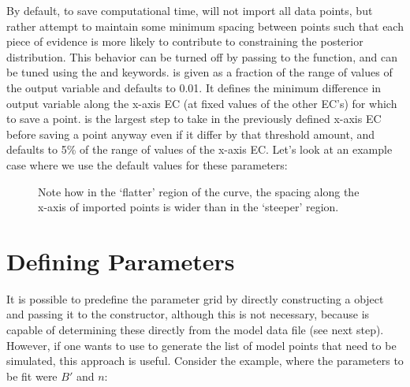 \documentclass[letterpaper,10pt,english]{sphinxmanual}
\begin{document}
%
\begin{sphinxVerbatim}[commandchars=\\\{\}]
  
\end{sphinxVerbatim}

By default, to save computational time,  will not import all data points, but rather attempt to maintain some minimum spacing between points such that each piece of evidence is more likely to contribute to constraining the posterior distribution. This behavior can be turned off by passing  to the  function, and can be tuned using the  and  keywords.  is given as a fraction of the range of values of the output variable and defaults to 0.01. It defines the minimum difference in output variable along the x-axis EC (at fixed values of the other EC’s) for which to save a point.  is the largest step to take in the previously defined x-axis EC before saving a point anyway even if it  differ by that threshold amount, and defaults to 5\% of the range of values of the x-axis EC. Let’s look at an example case where we use the default values for these parameters:

\begin{figure}[htbp]
\centering
\capstart

\noindent{}
\caption{Note how in the ‘flatter’ region of the curve, the spacing along the x-axis of imported points is wider than in the ‘steeper’ region.}\label{\detokenize{manual:id1}}\end{figure}


\section{Defining Parameters}
\label{\detokenize{manual:defining-parameters}}
It is possible to predefine the parameter grid by directly constructing a  object and passing it to the  constructor, although this is not necessary, because  is capable of determining these directly from the model data file (see next step). However, if one wants to use  to generate the list of model points that need to be simulated, this approach is useful. Consider the {\hyperref[\detokenize{examples:id}]{}} example, where the parameters to be fit were \(B'\) and \(n\):
\end{document}

